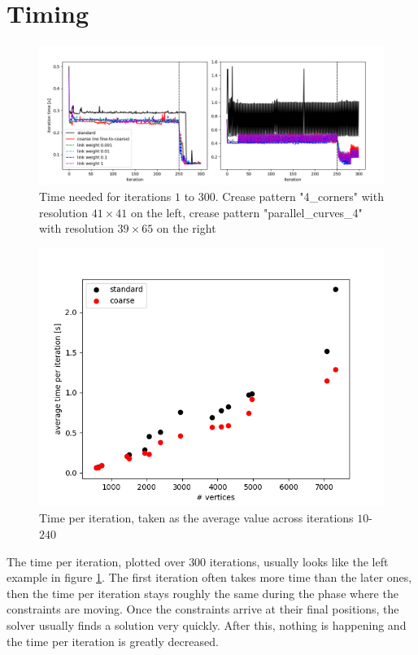 \documentclass[a4paper,twoside,12pt,nochapterprefix]{scrbook}
\begin{document}
\section{Timing}
\begin{figure}
    \centering
    \includegraphics[width=0.99\linewidth]{figures/0308_timeperiteration_examples}
    \caption{Time needed for iterations $1$ to $300$. Crease pattern "4\_corners" with resolution $41 \times 41$ on the left, crease pattern "parallel\_curves\_4" with resolution $39 \times 65$ on the right}
    \label{fig:results_cornerstime}
\end{figure}
\begin{figure}
    \centering
    \includegraphics[width=0.7\linewidth]{figures/0302_timeperiteration}
    \caption{Time per iteration, taken as the average value across iterations $10$-$240$}
      \label{fig:results_timeperiteration}
\end{figure}
The time per iteration, plotted over $300$ iterations, usually looks like the left example in figure \ref{fig:results_cornerstime}. The first iteration often takes more time than the later ones, then the time per iteration stays roughly the same during the phase where the constraints are moving. Once the constraints arrive at their final positions, the solver usually finds a solution very quickly. After this, nothing is happening and the time per iteration is greatly decreased.\newline
\end{document}
